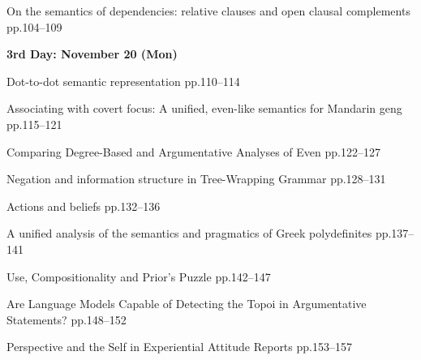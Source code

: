 \documentclass[12pt]{jarticle}
\begin{document}
     {On the semantics of dependencies: relative clauses and open clausal complements}
     {pp.104--109}







\noindent\textbf{\large 
3rd Day: November 20 (Mon)
}\\







  
     {Dot-to-dot semantic representation}
     {pp.110--114}
  
     {Associating with covert focus: A unified, even-like semantics for Mandarin geng}
     {pp.115--121}
  
     {Comparing Degree-Based and Argumentative Analyses of Even}
     {pp.122--127}




  
     {Negation and information structure in Tree-Wrapping Grammar}
     {pp.128--131}
  
     {Actions and beliefs}
     {pp.132--136}
  
     {A unified analysis of the semantics and pragmatics of Greek polydefinites}
     {pp.137--141}







  
     {Use, Compositionality and Prior's Puzzle}
     {pp.142--147}
  
     {Are Language Models Capable of Detecting the Topoi in Argumentative Statements?}
     {pp.148--152}
  
     {Perspective and the Self in Experiential Attitude Reports}
     {pp.153--157}



\end{document}
